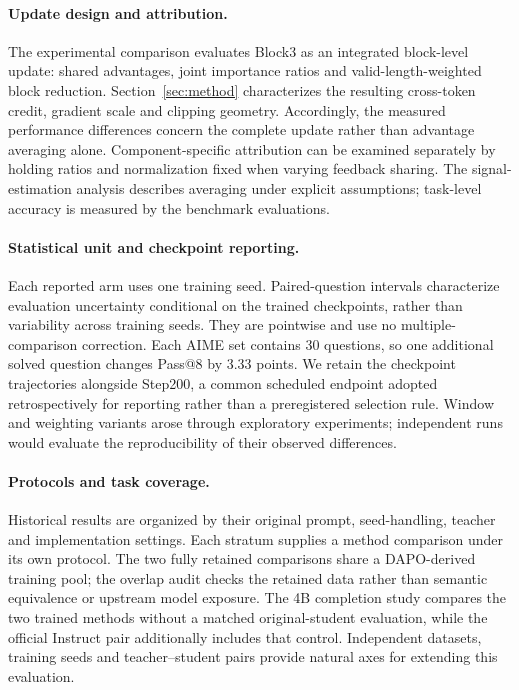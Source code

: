 \paragraph{Update design and attribution.}
The experimental comparison evaluates Block3 as an integrated block-level update: shared advantages, joint importance ratios and valid-length-weighted block reduction. Section~\ref{sec:method} characterizes the resulting cross-token credit, gradient scale and clipping geometry. Accordingly, the measured performance differences concern the complete update rather than advantage averaging alone. Component-specific attribution can be examined separately by holding ratios and normalization fixed when varying feedback sharing. The signal-estimation analysis describes averaging under explicit assumptions; task-level accuracy is measured by the benchmark evaluations.

\paragraph{Statistical unit and checkpoint reporting.}
Each reported arm uses one training seed. Paired-question intervals characterize evaluation uncertainty conditional on the trained checkpoints, rather than variability across training seeds. They are pointwise and use no multiple-comparison correction. Each AIME set contains 30 questions, so one additional solved question changes Pass@8 by 3.33 points. We retain the checkpoint trajectories alongside Step200, a common scheduled endpoint adopted retrospectively for reporting rather than a preregistered selection rule. Window and weighting variants arose through exploratory experiments; independent runs would evaluate the reproducibility of their observed differences.

\paragraph{Protocols and task coverage.}
Historical results are organized by their original prompt, seed-handling, teacher and implementation settings. Each stratum supplies a method comparison under its own protocol. The two fully retained comparisons share a DAPO-derived training pool; the overlap audit checks the retained data rather than semantic equivalence or upstream model exposure. The 4B completion study compares the two trained methods without a matched original-student evaluation, while the official Instruct pair additionally includes that control. Independent datasets, training seeds and teacher--student pairs provide natural axes for extending this evaluation.

